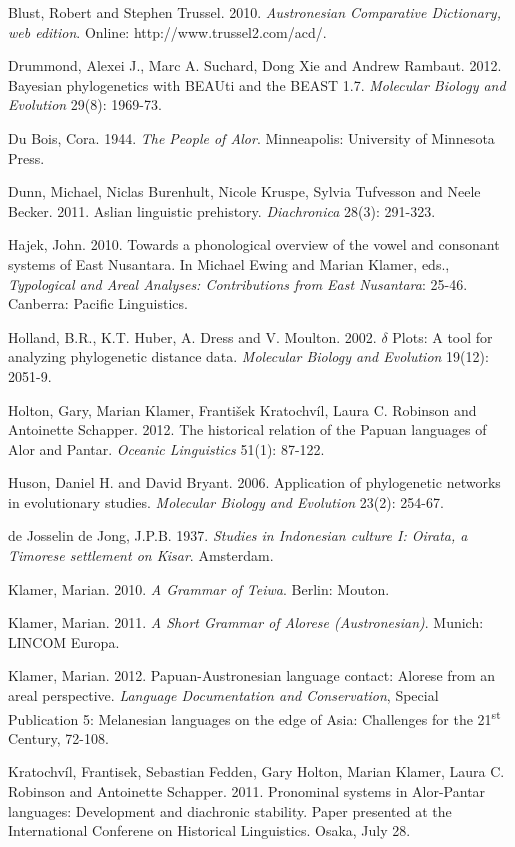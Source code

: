 Blust, Robert and Stephen Trussel. 2010. \textit{Austronesian Comparative Dictionary, web edition}. Online: http://www.trussel2.com/acd/.

Drummond, Alexei J., Marc A. Suchard, Dong Xie and Andrew Rambaut. 2012. Bayesian phylogenetics with BEAUti and the BEAST 1.7. \textit{Molecular Biology and Evolution} 29(8): 1969-73.

Du Bois, Cora. 1944. \textit{The People of Alor}. Minneapolis: University of Minnesota Press.

Dunn, Michael, Niclas Burenhult, Nicole Kruspe, Sylvia Tufvesson and Neele Becker. 2011. Aslian linguistic prehistory. \textit{Diachronica} 28(3): 291-323.

Hajek, John. 2010. Towards a phonological overview of the vowel and consonant systems of East Nusantara. In Michael Ewing and Marian Klamer, eds., \textit{Typological and Areal Analyses: Contributions from East Nusantara}: 25-46. Canberra: Pacific Linguistics.

Holland, B.R., K.T. Huber, A. Dress and V. Moulton. 2002. $\delta $ Plots: A tool for analyzing phylogenetic distance data. \textit{Molecular Biology and Evolution} 19(12): 2051-9.

Holton, Gary, Marian Klamer, Franti\v{s}ek Kratochv\'il, Laura C. Robinson and Antoinette Schapper. 2012. The historical relation of the Papuan languages of Alor and Pantar. \textit{Oceanic Linguistics} 51(1): 87-122.

Huson, Daniel H. and David Bryant. 2006. Application of phylogenetic networks in evolutionary studies. \textit{Molecular Biology and Evolution} 23(2): 254-67.

de Josselin de Jong, J.P.B. 1937. \textit{Studies in Indonesian culture I: Oirata, a Timorese settlement on Kisar}. Amsterdam.

Klamer, Marian. 2010. \textit{A Grammar of Teiwa}. Berlin: Mouton.

Klamer, Marian. 2011. \textit{A Short Grammar of Alorese (Austronesian)}. Munich: LINCOM Europa.

Klamer, Marian. 2012. Papuan-Austronesian language contact: Alorese from an areal perspective. \textit{Language Documentation and Conservation}, Special Publication 5: Melanesian languages on the edge of Asia: Challenges for the 21\textsuperscript{st} Century, 72-108.

Kratochv\'il, Frantisek, Sebastian Fedden, Gary Holton, Marian Klamer, Laura C. Robinson and Antoinette Schapper. 2011. Pronominal systems in Alor-Pantar languages: Development and diachronic stability. Paper presented at the International Conferene on Historical Linguistics. Osaka, July 28.

